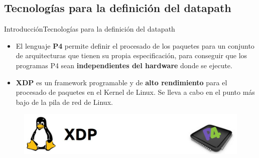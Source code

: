 \documentclass[10pt,compress,xcolor=table]{beamer} %
\begin{document}
\subsection{Tecnologías para la definición del datapath}
\begin{frame}{Introducción}{Tecnologías para la definición del datapath}

\begin{itemize}
    \item El lenguaje \textbf{P4}  permite definir el procesado de los paquetes para un conjunto de arquitecturas que tienen su propia especificación, para conseguir que los programas P4 sean \textbf{independientes del hardware} donde se ejecute. \vspace{0.2cm}

    \item \textbf{XDP} es un framework programable y de \textbf{alto rendimiento} para el procesado de paquetes en el Kernel de Linux. Se lleva a cabo en el punto más bajo de la pila de red de Linux.
\end{itemize}
 \begin{figure}
      \includegraphics[width=\textwidth]{img/5.jpg}
      \label{fig:datapaths}
    \end{figure}

\end{frame}

\end{document}
